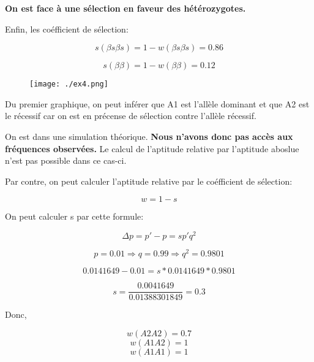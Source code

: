 \documentclass{article}
\begin{document}
\textbf{On est face à une sélection en faveur des hétérozygotes.}


Enfin, les coéfficient de sélection:

\begin{equation}
s(\beta s \beta s) = 1 - w(\beta s \beta s) = 0.86
\end{equation}

\begin{equation}
s(\beta\beta) = 1 - w(\beta\beta) = 0.12
\end{equation}



\pagebreak
\begin{figure}[H]
\texttt{[image: ./ex4.png]}
\end{figure}

Du premier graphique, on peut inférer que A1 est l'allèle dominant et que A2 est le récessif car on est en précense de sélection contre l'allèle récessif.

On est dans une simulation théorique. \textbf{Nous n'avons donc pas accès aux fréquences observées.} Le calcul de l'aptitude relative par l'aptitude aboslue n'est pas possible dans ce cas-ci.

Par contre, on peut calculer l'aptitude relative par le coéfficient de sélection:

\begin{equation}
w = 1 - s
\end{equation}

On peut calculer s par cette formule:

\begin{equation}
\Delta p = p' - p = sp'q^2
\end{equation}

\begin{equation}
p = 0.01 \Rightarrow q = 0.99 \Rightarrow q^2 = 0.9801
\end{equation}


\begin{equation}
0.0141649 - 0.01 = s * 0.0141649 * 0.9801
\end{equation}

\begin{equation}
s = \frac{0.0041649}{0.01388301849} = 0.3
\end{equation}

Donc,

\begin{equation}
w(A2A2) = 0.7
\end{equation}
\begin{equation}
w(A1A2) = 1
\end{equation}
\begin{equation}
w(A1A1) = 1
\end{equation}
\end{document}
